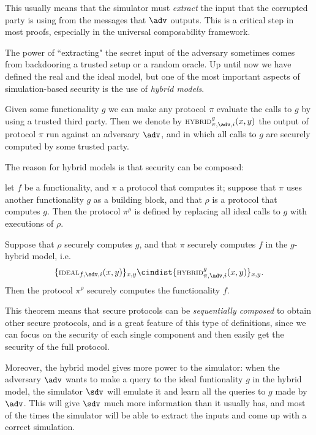 This usually means that the simulator must \emph{extract} the input that the corrupted party is using from the messages that $\adv$ outputs. This is a critical step in most proofs, especially in the universal composability framework.

The power of ``extracting" the secret input of the adversary sometimes comes from backdooring a trusted setup or a random oracle. Up until now we have defined the real and the ideal model, but one of the most important aspects of simulation-based security is the use of \emph{hybrid models}.

Given some functionality $g$ we can make any protocol $\pi$ evaluate the calls to $g$ by using a trusted third party. Then we denote by $\textsc{\scriptsize HYBRID}^g_{\pi,\adv,i}(x,y)$ the output of protocol $\pi$ run against an adversary $\adv$, and in which all calls to $g$ are securely computed by some trusted party.

The reason for hybrid models is that security can be composed: 
\begin{theorem}
    let $f$ be a functionality, and $\pi$ a protocol that computes it; suppose that $\pi$ uses another functionality $g$ as a building block, and that $\rho$ is a protocol that computes $g$. Then the protocol $\pi^\rho$ is defined by replacing all ideal calls to $g$ with executions of $\rho$.
    
    Suppose that $\rho$ securely computes $g$, and that $\pi$ securely computes $f$ in the $g$-hybrid model, i.e.
    $$ \{ \textsc{\scriptsize IDEAL}_{f,\sdv,i}(x,y) \}_{x,y} \cindist \{ \textsc{\scriptsize HYBRID}^g_{\pi,\adv,i}(x,y) \}_{x,y}. $$
    Then the protocol $\pi^\rho$ securely computes the functionality $f$.
\end{theorem}

This theorem means that secure protocols can be \emph{sequentially composed} to obtain other secure protocols, and is a great feature of this type of definitions, since we can focus on the security of each single component and then easily get the security of the full protocol.

Moreover, the hybrid model gives more power to the simulator: when the adversary $\adv$ wants to make a query to the ideal funtionality $g$ in the hybrid model, the simulator $\sdv$ will emulate it and learn all the queries to $g$ made by $\adv$. This will give $\sdv$ much more information than it usually has, and most of the times the simulator will be able to extract the inputs and come up with a correct simulation.  


